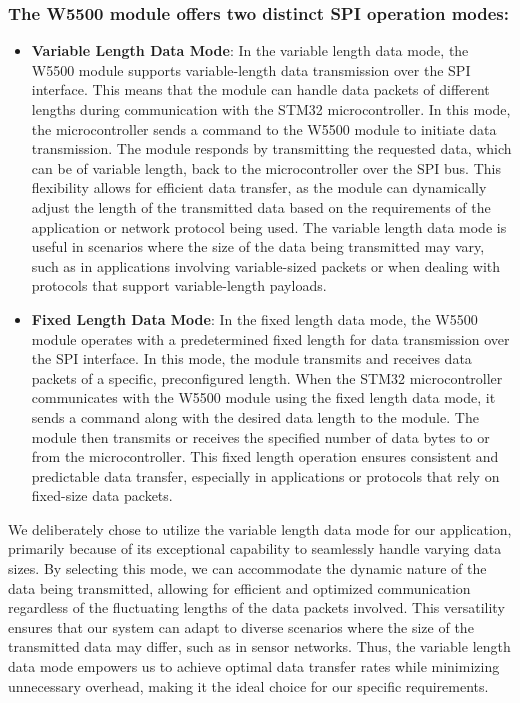 \documentclass[
12pt,
oneside, 
onehalfspacing, 
nolistspacing, 
parskip, 
chapterinoneline, 
]{AASTCOMPUTER}
\begin{document}
\subsubsection*{The W5500 module offers two distinct SPI operation modes:}
\begin{itemize}
\item \textbf{Variable Length Data Mode}: In the variable length data mode, the W5500 module supports variable-length data transmission over the SPI interface. This means that the module can handle data packets of different lengths during communication with the STM32 microcontroller. In this mode, the microcontroller sends a command to the W5500 module to initiate data transmission. The module responds by transmitting the requested data, which can be of variable length, back to the microcontroller over the SPI bus. This flexibility allows for efficient data transfer, as the module can dynamically adjust the length of the transmitted data based on the requirements of the application or network protocol being used. The variable length data mode is useful in scenarios where the size of the data being transmitted may vary, such as in applications involving variable-sized packets or when dealing with protocols that support variable-length payloads.
\item \textbf{Fixed Length Data Mode}: In the fixed length data mode, the W5500 module operates with a predetermined fixed length for data transmission over the SPI interface. In this mode, the module transmits and receives data packets of a specific, preconfigured length. When the STM32 microcontroller communicates with the W5500 module using the fixed length data mode, it sends a command along with the desired data length to the module. The module then transmits or receives the specified number of data bytes to or from the microcontroller. This fixed length operation ensures consistent and predictable data transfer, especially in applications or protocols that rely on fixed-size data packets.
\end{itemize}

We deliberately chose to utilize the variable length data mode for our application, primarily because of its exceptional capability to seamlessly handle varying data sizes. By selecting this mode, we can accommodate the dynamic nature of the data being transmitted, allowing for efficient and optimized communication regardless of the fluctuating lengths of the data packets involved. This versatility ensures that our system can adapt to diverse scenarios where the size of the transmitted data may differ, such as in sensor networks. Thus, the variable length data mode empowers us to achieve optimal data transfer rates while minimizing unnecessary overhead, making it the ideal choice for our specific requirements.
\end{document}
